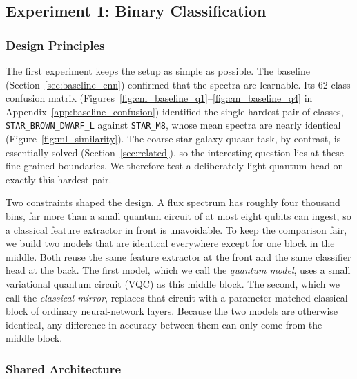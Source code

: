 
\subsection{Experiment 1: Binary Classification}
\label{sec:exp1_methods}

\subsubsection{Design Principles}
\label{sec:exp1_philosophy}

The first experiment keeps the setup as simple as possible. The baseline
(Section~\ref{sec:baseline_cnn}) confirmed that the spectra are learnable. Its 62-class
confusion matrix (Figures~\ref{fig:cm_baseline_q1}--\ref{fig:cm_baseline_q4} in
Appendix~\ref{app:baseline_confusion}) identified the single hardest pair of classes,
\texttt{STAR\_BROWN\_DWARF\_L} against \texttt{STAR\_M8}, whose mean spectra are nearly
identical (Figure~\ref{fig:ml_similarity}). The coarse star-galaxy-quasar task, by
contrast, is essentially solved (Section~\ref{sec:related}), so the interesting question
lies at these fine-grained boundaries. We therefore test a deliberately light quantum
head on exactly this hardest pair.

Two constraints shaped the design. A flux spectrum has roughly four thousand bins, far
more than a small quantum circuit of at most eight qubits can ingest, so a classical
feature extractor in front is unavoidable. To keep the comparison fair, we build two
models that are identical everywhere except for one block in the middle. Both reuse the
same feature extractor at the front and the same classifier head at the back. The first
model, which we call the \emph{quantum model}, uses a small variational quantum circuit
(VQC) as this middle block. The second, which we call the \emph{classical mirror},
replaces that circuit with a parameter-matched classical block of ordinary neural-network
layers. Because the two models are otherwise identical, any difference in accuracy
between them can only come from the middle block.

\subsubsection{Shared Architecture}
\label{sec:exp1_arch}

